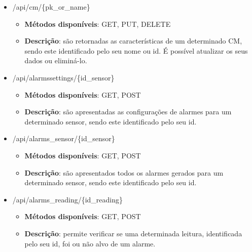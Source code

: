 \begin{itemize}
	
	\item /api/cm/\{pk\_or\_name\}
	\begin{itemize}
		\item \textbf{Métodos disponíveis}: GET, PUT, DELETE
		\item \textbf{Descrição}: são retornadas as características de um determinado \acl{CM}, sendo este identificado pelo seu nome ou id. É possível atualizar os seus dados ou eliminá-lo. 
	\end{itemize}
	
	
	\item /api/alarmssettings/\{id\_sensor\}
	\begin{itemize}
		\item \textbf{Métodos disponíveis}: GET, POST
		\item \textbf{Descrição}: são apresentadas as configurações de alarmes para um determinado sensor, sendo este identificado pelo seu id. 
	\end{itemize}
	
	
	\item /api/alarms\_sensor/\{id\_sensor\}
	\begin{itemize}
		\item \textbf{Métodos disponíveis}: GET, POST
		\item \textbf{Descrição}: são apresentados todos os alarmes gerados para um determinado sensor, sendo este identificado pelo seu id. 
	\end{itemize}
	
	
	\item /api/alarms\_reading/\{id\_reading\}
	\begin{itemize}
		\item \textbf{Métodos disponíveis}:  GET, POST
		\item \textbf{Descrição}: permite verificar se uma determinada leitura, identificada pelo seu id, foi ou não alvo de um alarme. 
	\end{itemize}
	
	
	
	
	
\end{itemize}


